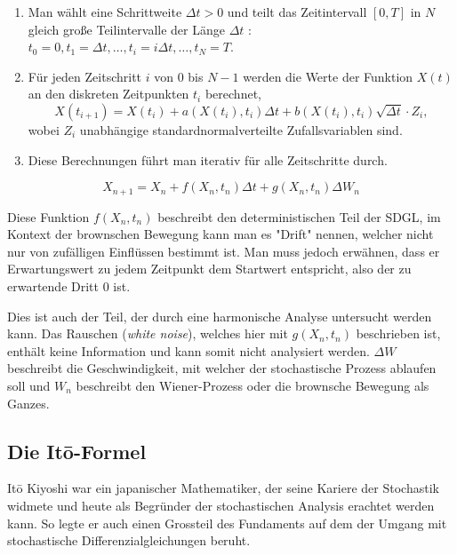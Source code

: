 \begin{enumerate}
	\item Man wählt eine Schrittweite $ \Delta t > 0 $ und teilt das Zeitintervall $ [0, T] $ in $ N $ gleich große Teilintervalle der Länge $ \Delta t$ : $ t_0 = 0, t_1 = \Delta t, \dots, t_i = i\Delta t, \dots, t_N = T $.
	\item Für jeden Zeitschritt $ i $ von $ 0 $ bis $ N-1 $ werden die Werte der Funktion $ X(t) $ an den diskreten Zeitpunkten $ t_i $ berechnet,
	\begin{equation}
		X(t_{i+1}) = X(t_i) + a(X(t_i), t_i) \Delta t + b(X(t_i), t_i) \sqrt{\Delta t} \cdot Z_i,
	\end{equation}
	wobei $ Z_i $ unabhängige standardnormalverteilte Zufallsvariablen sind.
	\item Diese Berechnungen führt man iterativ für alle Zeitschritte durch.
\end{enumerate}

\begin{equation}
	X_{n+1} = X_n + f(X_n,t_n) \Delta t + g(X_n,t_n) \Delta W_n
\end{equation}

Diese Funktion $ f(X_n,t_n) $ beschreibt den deterministischen Teil der SDGL, im Kontext der brownschen Bewegung kann man es "Drift" nennen, welcher nicht nur von zufälligen Einflüssen bestimmt ist. Man muss jedoch erwähnen, dass er Erwartungswert zu jedem Zeitpunkt dem Startwert entspricht, also der zu erwartende Dritt 0 ist. 


Dies ist auch der Teil, der durch eine harmonische Analyse untersucht werden kann. Das Rauschen (\textit{white noise}), welches hier mit $ g(X_n,t_n) $ beschrieben ist, enthält keine Information und kann somit nicht analysiert werden. $ \Delta W $ beschreibt die Geschwindigkeit, mit welcher der stochastische Prozess ablaufen soll und $ W_n $  beschreibt den Wiener-Prozess oder die brownsche Bewegung als Ganzes.



\subsection{Die Itō-Formel\label{brown:ito}}

Itō Kiyoshi war ein japanischer Mathematiker, der seine Kariere der Stochastik widmete und heute als Begründer der stochastischen Analysis erachtet werden kann. So legte er auch einen Grossteil des Fundaments auf dem der Umgang mit stochastische Differenzialgleichungen beruht. 

